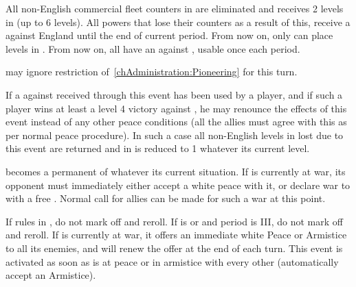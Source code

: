 \phevnt
\aparag All non-English commercial fleet counters in  are
eliminated and \ENG receives 2 \TradeFLEET levels in  (up to 6
levels). All powers that lose their counters as a result of this, receive a
\CB against England until the end of current period.
\aparag From now on, only \ENG can place \TradeFLEET levels in
.
\aparag From now on, all \MAJ have an \OCB against \ENG, usable once each
period.

\phadm
\aparag \ENG may ignore restriction of~\ref{chAdministration:Pioneering} for
this turn.

\phpaix
\aparag If a \CB against \ENG received through this event has been used by a
player, and if such a player wins at least a level 4 victory against \ENG, he
may renounce the effects of this event instead of any other peace conditions
(all the allies must agree with this as per normal peace procedure).
\aparag In such a case all non-English \TradeFLEET levels in 
lost due to this event are returned and \ENG \TradeFLEET in 
is reduced to 1 whatever its current level.






\phevnt
\aparag \paysecosse becomes a permanent \VASSAL of \ENG whatever its current
situation.
\aparag If \paysecosse is currently at war, its opponent must immediately
either accept a white peace with it, or declare war to \ENG with a free \CB.
Normal call for allies can be made for such a war at this point.





\condition{}
\aparag If  rules in \ENG, do not mark off and reroll.
\aparag If \ENG is \CATHCR or \CATHCO and period is III, do not mark off and
reroll.
\aparag If \ENG is currently at war, it offers an immediate white Peace or
Armistice to all its enemies, and will renew the offer at the end of each
turn.
\bparag This event is activated as soon as \ENG is at peace or in armistice
with every other \MAJ (\MIN automatically accept an Armistice).

